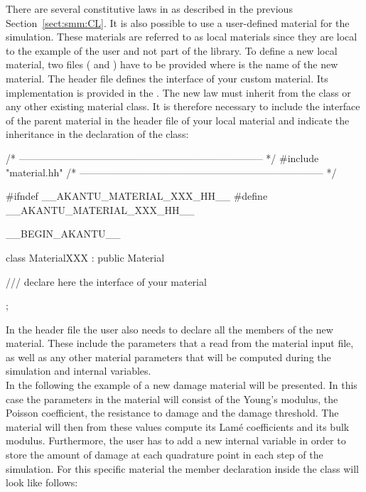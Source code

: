 There are several constitutive laws in \akantu as described in the
previous Section~\ref{sect:smm:CL}. It is also possible to use a
user-defined material for the simulation. These materials are referred
to as local materials since they are local to the example of the user
and not part of the \akantu library.  To define a new local material,
two files ( and ) have
to be provided where  is the name of the new material. The
header file  defines the interface of your
custom material. Its implementation is provided in the
. The new law must inherit from the
 class or any other existing material class. It is
therefore necessary to include the interface of the parent material
in the header file of your local material and indicate the inheritance
in the declaration of the class:
\begin{cpp}
/* -------------------------------------------------------------------------- */
#include "material.hh"
/* -------------------------------------------------------------------------- */

#ifndef __AKANTU_MATERIAL_XXX_HH__
#define __AKANTU_MATERIAL_XXX_HH__

__BEGIN_AKANTU__

class MaterialXXX : public Material {

/// declare here the interface of your material

};
\end{cpp}  
In the header file the user also needs to declare all the members of the new
material. These include the parameters that a read from the
material input file, as well as any other material parameters that will be computed during the simulation and internal variables.\\
In the following the example of a new damage material will be presented. In this
case the parameters in the material will consist of the Young's modulus, the
Poisson coefficient, the resistance to damage and the damage threshold. The
material will then from these values compute its Lam\'{e} coefficients and its
bulk modulus. Furthermore, the user has to add a new internal variable
 in order to store the amount of damage at each quadrature point in
each step of the simulation. For this specific material the member declaration
inside the class will look like follows:
